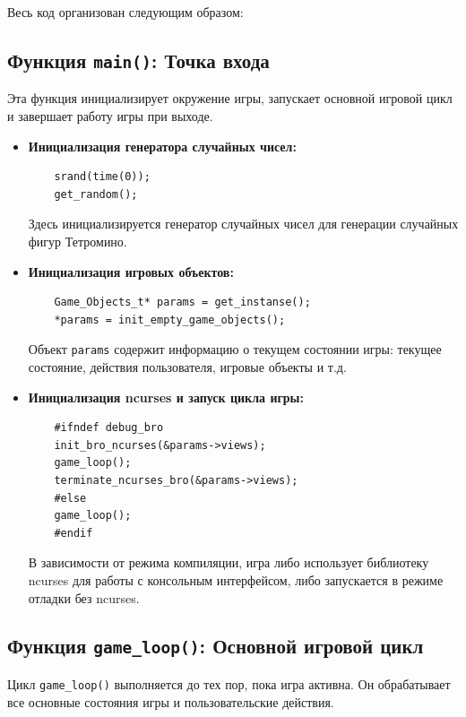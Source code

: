 \documentclass{article}
\begin{document}
Весь код организован следующим образом:

\subsection{Функция \texttt{main()}: Точка входа}

Эта функция инициализирует окружение игры, запускает основной игровой цикл и завершает работу игры при выходе.

\begin{itemize}
    \item \textbf{Инициализация генератора случайных чисел:}
    \begin{verbatim}
    srand(time(0));
    get_random();
    \end{verbatim}
    Здесь инициализируется генератор случайных чисел для генерации случайных фигур Тетромино.
    
    \item \textbf{Инициализация игровых объектов:}
    \begin{verbatim}
    Game_Objects_t* params = get_instanse();
    *params = init_empty_game_objects();
    \end{verbatim}
    Объект \texttt{params} содержит информацию о текущем состоянии игры: текущее состояние, действия пользователя, игровые объекты и т.д.

    \item \textbf{Инициализация ncurses и запуск цикла игры:}
    \begin{verbatim}
    #ifndef debug_bro
    init_bro_ncurses(&params->views);
    game_loop();
    terminate_ncurses_bro(&params->views);
    #else
    game_loop();
    #endif
    \end{verbatim}
    В зависимости от режима компиляции, игра либо использует библиотеку ncurses для работы с консольным интерфейсом, либо запускается в режиме отладки без ncurses.
\end{itemize}

\subsection{Функция \texttt{game\_loop()}: Основной игровой цикл}

Цикл \texttt{game\_loop()} выполняется до тех пор, пока игра активна. Он обрабатывает все основные состояния игры и пользовательские действия.
\end{document}
